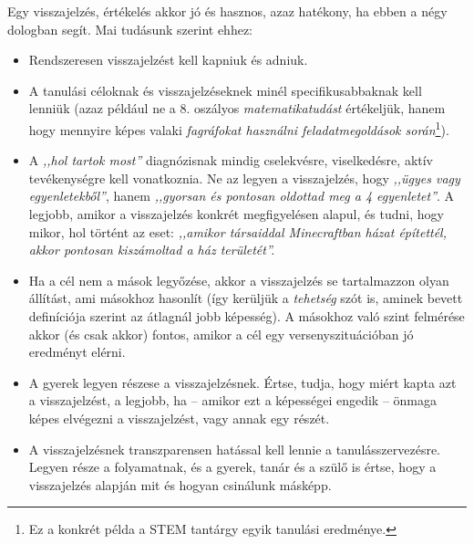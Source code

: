 Egy visszajelzés, értékelés akkor jó és hasznos, azaz hatékony, ha ebben a négy
dologban segít. Mai tudásunk szerint ehhez:
\begin{itemize}
      \item Rendszeresen visszajelzést kell kapniuk és adniuk.
      \item A tanulási céloknak és visszajelzéseknek minél specifikusabbaknak
            kell
            lenniük (azaz például ne a 8. oszályos \emph{matematikatudást}
            értékeljük,
            hanem hogy mennyire képes valaki \emph{fagráfokat
                  használni
                  feladatmegoldások során}\footnote{Ez a konkrét példa a STEM
                  tantárgy
                  egyik
                  tanulási eredménye.}).
      \item A \emph{,,hol tartok most''} diagnózisnak mindig cselekvésre,
            viselkedésre, aktív tevékenységre kell vonatkoznia. Ne az legyen a
            visszajelzés, hogy \emph{,,ügyes vagy egyenletekből''}, hanem
            \emph{,,gyorsan és
                  pontosan oldottad meg a 4 egyenletet''}. A legjobb, amikor a
            visszajelzés
            konkrét megfigyelésen alapul, és tudni, hogy mikor, hol történt az
            eset:
            \emph{,,amikor társaiddal Minecraftban házat építettél, akkor
                  pontosan
                  kiszámoltad a ház területét''.}
      \item Ha a cél nem a mások legyőzése, akkor a visszajelzés se
            tartalmazzon
            olyan állítást, ami másokhoz hasonlít (így kerüljük a
            \emph{tehetség}
            szót is,
            aminek bevett definíciója szerint az átlagnál jobb képesség). A
            másokhoz való
            szint felmérése akkor (és csak akkor) fontos, amikor a cél egy
            versenyszituációban jó eredményt elérni.

      \item A gyerek legyen részese a visszajelzésnek. Értse, tudja, hogy miért
            kapta
            azt a visszajelzést, a legjobb, ha -- amikor ezt a képességei
            engedik
            -- önmaga
            képes elvégezni a visszajelzést, vagy annak egy részét.
      \item A visszajelzésnek transzparensen hatással kell lennie a
            tanulásszervezésre. Legyen része a folyamatnak, és a gyerek, tanár
            és a
            szülő
            is értse, hogy a visszajelzés alapján mit és hogyan csinálunk
            másképp.
\end{itemize}

